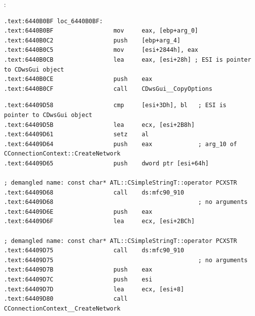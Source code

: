  :

\begin{lstlisting}
.text:6440B0BF loc_6440B0BF:
.text:6440B0BF                 mov     eax, [ebp+arg_0]
.text:6440B0C2                 push    [ebp+arg_4]
.text:6440B0C5                 mov     [esi+2844h], eax
.text:6440B0CB                 lea     eax, [esi+28h] ; ESI is pointer to CDwsGui object
.text:6440B0CE                 push    eax
.text:6440B0CF                 call    CDwsGui__CopyOptions
\end{lstlisting}



\begin{lstlisting}
.text:64409D58                 cmp     [esi+3Dh], bl   ; ESI is pointer to CDwsGui object
.text:64409D5B                 lea     ecx, [esi+2B8h]
.text:64409D61                 setz    al
.text:64409D64                 push    eax             ; arg_10 of CConnectionContext::CreateNetwork
.text:64409D65                 push    dword ptr [esi+64h]

; demangled name: const char* ATL::CSimpleStringT::operator PCXSTR 
.text:64409D68                 call    ds:mfc90_910
.text:64409D68                                         ; no arguments
.text:64409D6E                 push    eax
.text:64409D6F                 lea     ecx, [esi+2BCh]

; demangled name: const char* ATL::CSimpleStringT::operator PCXSTR 
.text:64409D75                 call    ds:mfc90_910
.text:64409D75                                         ; no arguments
.text:64409D7B                 push    eax
.text:64409D7C                 push    esi
.text:64409D7D                 lea     ecx, [esi+8]
.text:64409D80                 call    CConnectionContext__CreateNetwork
\end{lstlisting}

